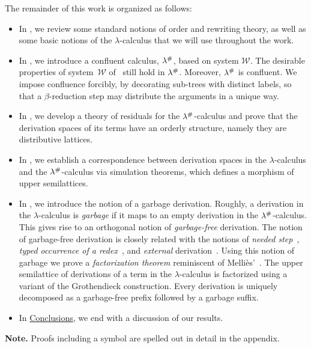 The remainder of this work is organized as follows:
\begin{itemize}
\item
  In , we review some standard notions of order and rewriting theory, as well as some
  basic notions of the $\lambda$-calculus that we will use throughout the work.
\item
  In , we introduce a confluent calculus, $\lambda^{\mathtt{\#}}$,
  based on system $\mathcal{W}$.
  The desirable properties of system~$\mathcal{W}$ of~\cite{bucciarelli2017non} still hold in $\lambda^{\mathtt{\#}}$.
  Moreover, $\lambda^{\mathtt{\#}}$ is confluent.
  We impose confluence forcibly, by decorating sub-trees with distinct labels, so that
  a $\beta$-reduction step may distribute the arguments in a unique way.
\item
  In , we develop a theory of residuals for the
  $\lambda^{\mathtt{\#}}$-calculus and prove that the derivation spaces of its terms
  have an orderly structure, namely they are distributive lattices.
\item
  In , we establish a correspondence between derivation spaces in the
  $\lambda$-calculus and the $\lambda^{\mathtt{\#}}$-calculus via simulation theorems,
  which defines a morphism of upper semilattices.
\item
  In , we introduce the notion of a garbage derivation.
  Roughly, a derivation in the $\lambda$-calculus is {\em garbage} if it maps to
  an empty derivation in the $\lambda^{\mathtt{\#}}$-calculus.
  This gives rise to an orthogonal notion of {\em garbage-free} derivation.
  The notion of garbage-free derivation is closely related
  with the notions of {\em needed step}~\cite[Section~8.6]{Terese},
  {\em typed occurrence of a redex}~\cite{bucciarelli2017non},
  and {\em external} derivation~\cite{DBLP:conf/ctcs/Mellies97}.
  Using this notion of garbage we prove a {\em factorization theorem}
  reminiscent of Melli\`es'~\cite{DBLP:conf/ctcs/Mellies97}.
  The upper semilattice of derivations of a term in the $\lambda$-calculus
  is factorized using a variant of the Grothendieck construction.
  Every derivation is uniquely decomposed as a garbage-free prefix followed by a garbage suffix.
\item
  In \hyperref[ch:conclusions]{Conclusions}, we end with a discussion of our results.
\end{itemize}
\bigskip
{\bf Note.} Proofs including a \SeeAppendix symbol are spelled out in detail in the appendix.
